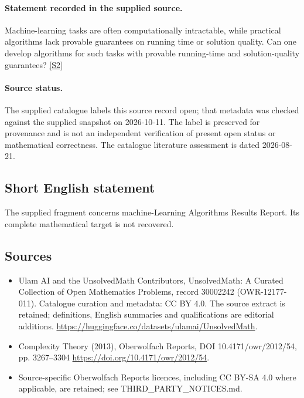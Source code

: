 \documentclass[11pt]{article}
\newcommand{\sref}[2]{\hyperlink{source:#1:#2}{[S#2]}}
\begin{document}
\paragraph{Statement recorded in the supplied source.}
Machine-learning tasks are often computationally intractable, while practical algorithms lack provable guarantees on running time or solution quality. Can one develop algorithms for such tasks with provable running-time and solution-quality guarantees? \sref{30002242}{2}
\paragraph{Source status.}
The supplied catalogue labels this source record open; that metadata was checked against the supplied snapshot on 2026-10-11. The label is preserved for provenance and is not an independent verification of present open status or mathematical correctness. The catalogue literature assessment is dated 2026-08-21.
\subsection{Short English statement}
The supplied fragment concerns machine-Learning Algorithms Results Report. Its complete mathematical target is not recovered.
\subsection{Sources}
\begin{itemize}
\item[\hypertarget{source:30002242:1}{S1}] Ulam AI and the UnsolvedMath Contributors, UnsolvedMath: A Curated Collection of Open Mathematics Problems, record 30002242 (OWR-12177-011). Catalogue curation and metadata: CC BY 4.0. The source extract is retained; definitions, English summaries and qualifications are editorial additions.
\url{https://huggingface.co/datasets/ulamai/UnsolvedMath}.
\item[\hypertarget{source:30002242:2}{S2}] Complexity Theory (2013), Oberwolfach Reports, DOI 10.4171/owr/2012/54, pp. 3267--3304
\url{https://doi.org/10.4171/owr/2012/54}.
\item Source-specific Oberwolfach Reports licences, including CC BY-SA 4.0 where applicable, are retained; see THIRD\_PARTY\_NOTICES.md.
\end{itemize}
\end{document}
